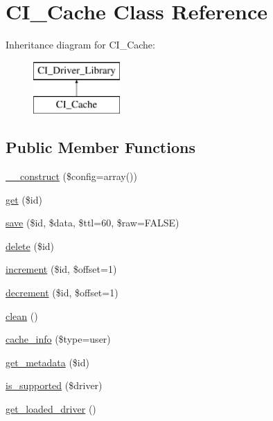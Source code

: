 \hypertarget{class_c_i___cache}{}\section{C\+I\+\_\+\+Cache Class Reference}
\label{class_c_i___cache}
Inheritance diagram for C\+I\+\_\+\+Cache\+:\begin{figure}[H]
\begin{center}
\leavevmode
\includegraphics[height=2.000000cm]{class_c_i___cache}
\end{center}
\end{figure}
\subsection*{Public Member Functions}
\begin{DoxyCompactItemize}
\item 
\mbox{\hyperlink{class_c_i___cache_af7f9493844d2d66e924e3c1df51ce616}{\+\_\+\+\_\+construct}} (\$config=array())
\item 
\mbox{\hyperlink{class_c_i___cache_a50e3bfb586b2f42932a6a93f3fbb0828}{get}} (\$id)
\item 
\mbox{\hyperlink{class_c_i___cache_a472645db04a8ce4b040b789a3062a7d2}{save}} (\$id, \$data, \$ttl=60, \$raw=F\+A\+L\+SE)
\item 
\mbox{\hyperlink{class_c_i___cache_a2f8258add505482d7f00ea26493a5723}{delete}} (\$id)
\item 
\mbox{\hyperlink{class_c_i___cache_a2f07a4e09b57f4460d49852497d1808f}{increment}} (\$id, \$offset=1)
\item 
\mbox{\hyperlink{class_c_i___cache_a4eb1c2772c8efc48c411ea060dd040b7}{decrement}} (\$id, \$offset=1)
\item 
\mbox{\hyperlink{class_c_i___cache_adb40b812890a8bc058bf6b7a0e1a54d9}{clean}} ()
\item 
\mbox{\hyperlink{class_c_i___cache_a26b8f7eef651dc3c0b5b9e1d8661a9ae}{cache\+\_\+info}} (\$type=\textquotesingle{}user\textquotesingle{})
\item 
\mbox{\hyperlink{class_c_i___cache_a59635cf18e997c5141bffa05ff7622e0}{get\+\_\+metadata}} (\$id)
\item 
\mbox{\hyperlink{class_c_i___cache_a6901d466745bfdfe4dc772fa012c99eb}{is\+\_\+supported}} (\$driver)
\item 
\mbox{\hyperlink{class_c_i___cache_ae8a112b6bd3cafdbbea477683eb11918}{get\+\_\+loaded\+\_\+driver}} ()
\end{DoxyCompactItemize}
